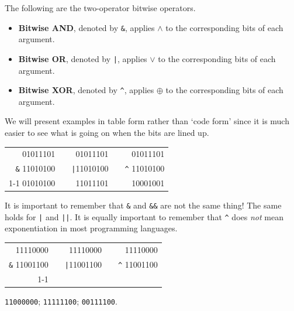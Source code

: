 

\begin{df}
The following are the two-operator bitwise operators.
\begin{itemize}
\item
{\bf Bitwise AND},  denoted by \verb+&+, applies $\wedge$ to the corresponding bits
of each argument. 
\item
{\bf Bitwise OR},  denoted by \verb+|+, applies $\vee$ to the corresponding bits
of each argument. 
\item
{\bf Bitwise XOR},  denoted by \verb+^+, applies $\oplus$ to the corresponding bits
of each argument. 
\end{itemize}
\end{df}

We will present examples in table form rather than `code form' since it is much easier to see
what is going on when the bits are lined up.

\begin{exa}
\begin{tabular}[t]{rrrrr}
 			01011101&& 			  01011101			&& 01011101\\
\verb+&+ 	11010100	&&\verb+|+11010100	&&\verb+^+ 11010100\\ \cline{1-1}\cline{3-3}\cline{5-5}
			01010100&& 			  11011101			&& 10001001\\
 \end{tabular}
 \end{exa}
 

\begin{rem}
It is important to remember that \verb+&+ and \verb+&&+ are not the same thing!
The same holds for \verb+|+ and \verb+||+.
It is equally important to remember that \verb+^+ does {\em not} mean exponentiation in
most programming languages.
\end{rem}


\begin{exer}
{\Large
\begin{tabular}[t]{rrrrr}
 			11110000&& 			  11110000			&& 11110000\\
\verb+&+ 	11001100	&&\verb+|+11001100	&&\verb+^+ 11001100\\ \cline{1-1}\cline{3-3}\cline{5-5}
			&& 			  			&& \\
 \end{tabular}
 }
 \begin{answer}
 \verb+11000000+; \verb+11111100+; \verb+00111100+.
 \end{answer}
 \end{exer}
 
